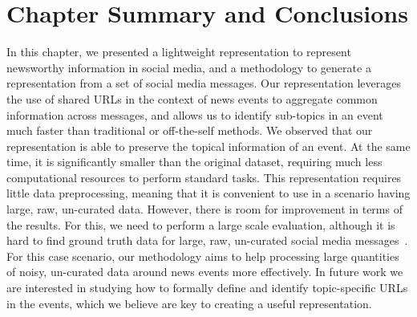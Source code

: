 \section{Chapter Summary and Conclusions}\label{sec:conclusions}





In this chapter, we presented a lightweight representation to represent newsworthy
information in social media, and a methodology to generate a representation from
a set of social media messages. 
%
Our representation leverages the use of shared URLs in the context of news
events to aggregate common information across messages, and allows us to
identify sub-topics in an event much faster than traditional or off-the-self
methods.
%
We observed that our representation is able to preserve the topical information
of an event.
%
At the same time, it is significantly smaller than the original
dataset, requiring much less computational resources to perform standard tasks.
%
This representation requires little data preprocessing, meaning that it is
convenient to use in a scenario having large, raw, un-curated data.
%
However, there is room for improvement in terms of the results.
%
For this, we need to perform a large scale evaluation, although it is hard to
find ground truth data for large, raw, un-curated social media
messages~\cite{Alonso:2015:WCW:2740908.2745397}.
%
For this case scenario, our methodology aims to help processing large quantities
of noisy, un-curated data around news events more effectively.
%
In future work we are interested in studying how to formally define and identify
topic-specific URLs in the events, which we believe are key to creating a useful
representation.
%
%